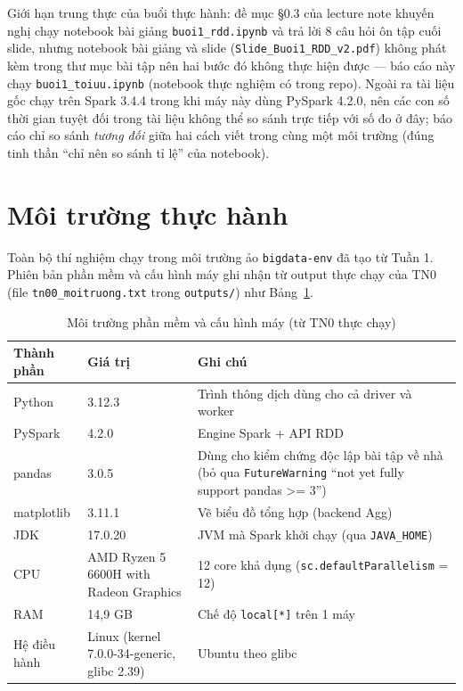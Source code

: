 \documentclass[12pt,a4paper,oneside]{article}
\begin{document}
Giới hạn trung thực của buổi thực hành: đề mục §0.3 của lecture note khuyến nghị chạy notebook bài giảng \texttt{buoi1\_rdd.ipynb} và trả lời 8 câu hỏi ôn tập cuối slide, nhưng notebook bài giảng và slide (\texttt{Slide\_Buoi1\_RDD\_v2.pdf}) không phát kèm trong thư mục bài tập nên hai bước đó không thực hiện được --- báo cáo này chạy \texttt{buoi1\_toiuu.ipynb} (notebook thực nghiệm có trong repo). Ngoài ra tài liệu gốc chạy trên Spark 3.4.4 trong khi máy này dùng PySpark 4.2.0, nên các con số thời gian tuyệt đối trong tài liệu không thể so sánh trực tiếp với số đo ở đây; báo cáo chỉ so sánh \emph{tương đối} giữa hai cách viết trong cùng một môi trường (đúng tinh thần ``chỉ nên so sánh tỉ lệ'' của notebook).

\section{Môi trường thực hành}
\label{sec:moitruong}

Toàn bộ thí nghiệm chạy trong môi trường ảo \texttt{bigdata-env} đã tạo từ Tuần 1. Phiên bản phần mềm và cấu hình máy ghi nhận từ output thực chạy của TN0 (file \texttt{tn00\_moitruong.txt} trong \texttt{outputs/}) như Bảng~\ref{tab:env}.

\begin{table}[H]
\centering
\caption{Môi trường phần mềm và cấu hình máy (từ TN0 thực chạy)}
\label{tab:env}
\begin{tabularx}{\textwidth}{l l X}
\toprule
Thành phần & Giá trị & Ghi chú \\
\midrule
Python & 3.12.3 & Trình thông dịch dùng cho cả driver và worker \\
PySpark & 4.2.0 & Engine Spark + API RDD \\
pandas & 3.0.5 & Dùng cho kiểm chứng độc lập bài tập về nhà (bỏ qua \texttt{FutureWarning} ``not yet fully support pandas >= 3'') \\
matplotlib & 3.11.1 & Vẽ biểu đồ tổng hợp (backend Agg) \\
JDK & 17.0.20 & JVM mà Spark khởi chạy (qua \texttt{JAVA\_HOME}) \\
CPU & AMD Ryzen 5 6600H with Radeon Graphics & 12 core khả dụng (\texttt{sc.defaultParallelism} = 12) \\
RAM & 14,9 GB & Chế độ \texttt{local[*]} trên 1 máy \\
Hệ điều hành & Linux (kernel 7.0.0-34-generic, glibc 2.39) & Ubuntu theo glibc \\
\bottomrule
\end{tabularx}
\end{table}
\end{document}
